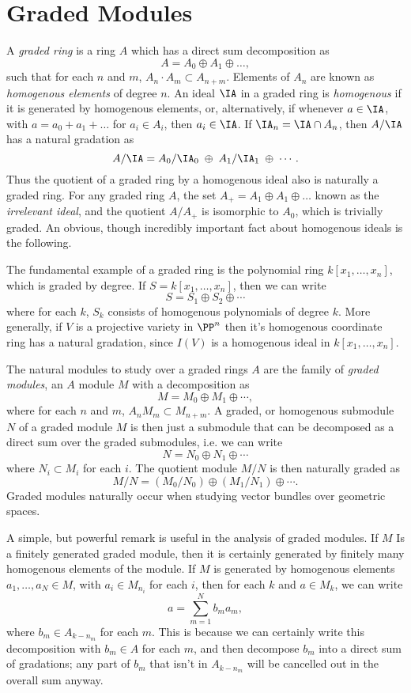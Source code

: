 \chapter{Graded Modules}

A \emph{graded ring} is a ring $A$ which has a direct sum decomposition as
%
\[ A = A_0 \oplus A_1 \oplus \dots, \]
%
such that for each $n$ and $m$, $A_n \cdot A_m \subset A_{n + m}$. Elements of $A_n$ are known as \emph{homogenous elements} of degree $n$. An ideal $\IA$ in a graded ring is \emph{homogenous} if it is generated by homogenous elements, or, alternatively, if whenever $a \in \IA$, with $a = a_0 + a_1 + \dots$ for $a_i \in A_i$, then $a_i \in \IA$. If $\IA_n = \IA \cap A_n$, then $A/\IA$ has a natural gradation as
%
\[ A/\IA = A_0/\IA_0\; \oplus\; A_1/\IA_1\; \oplus\; \cdots. \]
%
Thus the quotient of a graded ring by a homogenous ideal also is naturally a graded ring. For any graded ring $A$, the set $A_+ = A_1 \oplus A_1 \oplus \dots$ known as the \emph{irrelevant ideal}, and the quotient $A/A_+$ is isomorphic to $A_0$, which is trivially graded. An obvious, though incredibly important fact about homogenous ideals is the following.

\begin{example}
    The fundamental example of a graded ring is the polynomial ring $k[x_1, \dots, x_n]$, which is graded by degree. If $S = k[x_1,\dots,x_n]$, then we can write
    \[ S = S_1 \oplus S_2 \oplus \cdots \]
    where for each $k$, $S_k$ consists of homogenous polynomials of degree $k$. More generally, if $V$ is a projective variety in $\PP^n$ then it's homogenous coordinate ring has a natural gradation, since $I(V)$ is a homogenous ideal in $k[x_1,\dots,x_n]$.
\end{example}

The natural modules to study over a graded rings $A$ are the family of \emph{graded modules}, an $A$ module $M$ with a decomposition as
%
\[ M = M_0 \oplus M_1 \oplus \cdots, \]
%
where for each $n$ and $m$, $A_n M_m \subset M_{n+m}$. A graded, or homogenous submodule $N$ of a graded module $M$ is then just a submodule that can be decomposed as a direct sum over the graded submodules, i.e. we can write
%
\[ N = N_0 \oplus N_1 \oplus \cdots \]
%
where $N_i \subset M_i$ for each $i$. The quotient module $M/N$ is then naturally graded as
%
\[ M/N = (M_0/N_0) \oplus (M_1/N_1) \oplus \cdots. \]
%
Graded modules naturally occur when studying vector bundles over geometric spaces.

A simple, but powerful remark is useful in the analysis of graded modules. If $M$ Is a finitely generated graded module, then it is certainly generated by finitely many homogenous elements of the module. If $M$ is generated by homogenous elements $a_1, \dots, a_N \in M$, with $a_i \in M_{n_i}$ for each $i$, then for each $k$ and $a \in M_k$, we can write
%
\[ a = \sum_{m = 1}^N b_m a_m, \]
%
where $b_m \in A_{k - n_m}$ for each $m$. This is because we can certainly write this decomposition with $b_m \in A$ for each $m$, and then decompose $b_m$ into a direct sum of gradations; any part of $b_m$ that isn't in $A_{k-n_m}$ will be cancelled out in the overall sum anyway.

